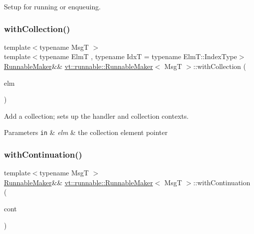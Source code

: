 Setup for running or enqueuing. 

\mbox{\label{structvt_1_1runnable_1_1_runnable_maker_aed99a9b0607da59ab7ad7ee56255fcc8}} 
\subsubsection{\texorpdfstring{with\+Collection()}{withCollection()}}
{\footnotesize\ttfamily template$<$typename MsgT $>$ \\
template$<$typename ElmT , typename IdxT  = typename Elm\+T\+::\+Index\+Type$>$ \\
\hyperlink{structvt_1_1runnable_1_1_runnable_maker}{Runnable\+Maker}\&\& \hyperlink{structvt_1_1runnable_1_1_runnable_maker}{vt\+::runnable\+::\+Runnable\+Maker}$<$ MsgT $>$\+::with\+Collection (\begin{DoxyParamCaption}\item[{ElmT $\ast$}]{elm }\end{DoxyParamCaption})\hspace{0.3cm}{\ttfamily [inline]}}



Add a collection; sets up the handler and collection contexts. 


\begin{DoxyParams}[1]{Parameters}
\mbox{\tt in}  & {\em elm} & the collection element pointer \\
\hline
\end{DoxyParams}
\mbox{\label{structvt_1_1runnable_1_1_runnable_maker_aa547117a9c2e36d77f60712ec78eef58}} 
\subsubsection{\texorpdfstring{with\+Continuation()}{withContinuation()}}
{\footnotesize\ttfamily template$<$typename MsgT $>$ \\
\hyperlink{structvt_1_1runnable_1_1_runnable_maker}{Runnable\+Maker}\&\& \hyperlink{structvt_1_1runnable_1_1_runnable_maker}{vt\+::runnable\+::\+Runnable\+Maker}$<$ MsgT $>$\+::with\+Continuation (\begin{DoxyParamCaption}\item[{\hyperlink{namespacevt_ae0a5a7b18cc99d7b732cb4d44f46b0f3}{Action\+Type}}]{cont }\end{DoxyParamCaption})\hspace{0.3cm}{\ttfamily [inline]}}




